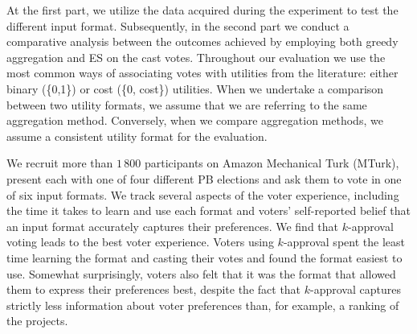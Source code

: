 \documentclass[mnsc,blindrev]{informs3_freeuse} %
\newcommand{\kibitz}[2]{\ifnum\Comments=1{\color{#1}{#2}}\fi}
\newcommand{\gb}[1]{\kibitz{red}{[GB:#1]}}
\newcommand{\mes}{ES}
\begin{document}

At the first part, we utilize the data acquired during the experiment to test the different input format. Subsequently, in the second part we conduct a comparative analysis between the outcomes achieved by employing both greedy aggregation and \mes{} on the cast votes.  Throughout our evaluation we use the most common ways of associating votes with utilities from the literature: either binary (\{0,1\}) or cost (\{0, cost\}) utilities.
When we undertake a comparison between two utility formats, we assume that we are referring to the same aggregation method. Conversely, when we compare aggregation methods, we assume a consistent utility format for the evaluation.



We recruit more than $1\,800$ participants on Amazon Mechanical Turk (MTurk),  present each with one of four different PB elections  and ask them to vote in one of six   input formats. 
We track several aspects of the voter experience, including the time it takes to learn and use each format and voters' self-reported belief that an input format accurately captures their preferences.  
%
We find that $k$-approval voting leads to the best voter experience. Voters using $k$-approval spent the least time  learning the format and casting their votes and found the format easiest to use. Somewhat surprisingly, voters also felt that  it was the format that allowed them to express their preferences best, despite the fact that $k$-approval captures strictly less information about voter preferences than, for example,  a ranking of the projects. 
\end{document}
